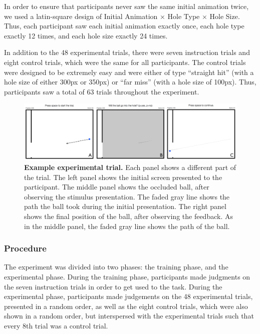 \documentclass[11pt]{article}
\begin{document}
In order to ensure that participants never saw the same initial animation twice, we used a latin-square design of Initial Animation $\times$ Hole Type $\times$ Hole Size. Thus, each participant saw each initial animation exactly once, each hole type exactly 12 times, and each hole size exactly 24 times.

In addition to the 48 experimental trials, there were seven instruction trials and eight control trials, which were the same for all participants. The control trials were designed to be extremely easy and were either of type ``straight hit'' (with a hole size of either 300px or 350px) or ``far miss'' (with a hole size of 100px). Thus, participants saw a total of 63 trials throughout the experiment.

\begin{figure}[t]
    \begin{center}
        \includegraphics[width=\textwidth]{figures/experiment.png}
        \caption{\textbf{Example experimental trial.} Each panel shows a different part of the trial. The left panel shows the initial screen presented to the participant. The middle panel shows the occluded ball, after observing the stimulus presentation. The faded gray line shows the path the ball took during the initial presentation. The right panel shows the final position of the ball, after observing the feedback. As in the middle panel, the faded gray line shows the path of the ball.}
        \label{fig:experiment}
    \end{center}
\end{figure}

\subsubsection{Procedure}

The experiment was divided into two phases: the training phase, and the experimental phase. During the training phase, participants made judgments on the seven instruction trials in order to get used to the task. During the experimental phase, participants made judgements on the 48 experimental trials, presented in a random order, as well as the eight control trials, which were also shown in a random order, but interspersed with the experimental trials such that every 8th trial was a control trial.
\end{document}
